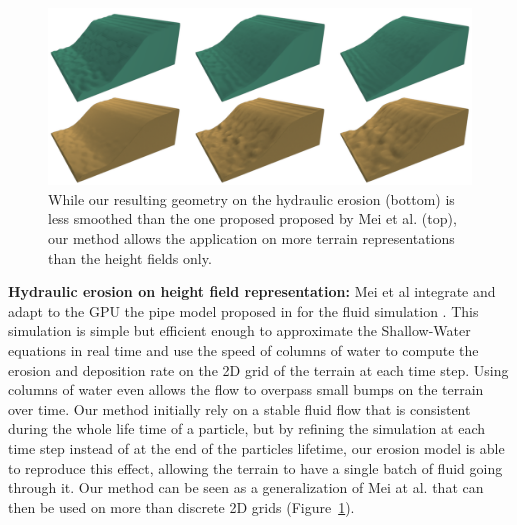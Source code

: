 \begin{figure}[b]
\centering
\includegraphics[width= 1\linewidth]{otherPapersRepro/hydro.pdf}
\caption{While our resulting geometry on the hydraulic erosion (bottom) is less smoothed than the one proposed proposed by Mei et al. \cite{Mei2007} (top), our method allows the application on more terrain representations than the height fields only.}
\label{fig:erosion_screen-mei2007-1}

\end{figure}

\textbf{Hydraulic erosion on height field representation: }
Mei et al integrate and adapt to the GPU the pipe model proposed in \cite{OBrien1995} for the fluid simulation \cite{Mei2007}. This simulation is simple but efficient enough to approximate the Shallow-Water equations in real time and use the speed of columns of water to compute the erosion and deposition rate on the 2D grid of the terrain at each time step. Using columns of water even allows the flow to overpass small bumps on the terrain over time. Our method initially rely on a stable fluid flow that is consistent during the whole life time of a particle, but by refining the simulation at each time step instead of at the end of the particles lifetime, our erosion model is able to reproduce this effect, allowing the terrain to have a single batch of fluid going through it. Our method can be seen as a generalization of Mei at al. that can then be used on more than discrete 2D grids (Figure~\ref{fig:erosion_screen-mei2007-1}). 

